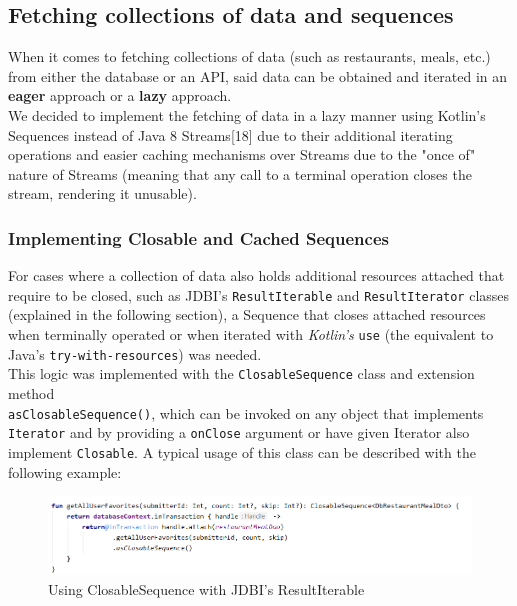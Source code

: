 \subsection{Fetching collections of data and sequences}

When it comes to fetching collections of data (such as restaurants, meals, etc.) from either the database or an API, said data can be obtained
and iterated in an \textbf{eager} approach or a \textbf{lazy} approach.\\

We decided to implement the fetching of data in a lazy manner using Kotlin’s Sequences\cite{sequences}
instead of Java 8 Streams[18] due to their additional iterating operations and easier caching mechanisms over Streams due to the "once of" nature
of Streams (meaning that any call to a terminal operation closes the stream, rendering it unusable).\\

\subsubsection{Implementing Closable and Cached Sequences}

For cases where a collection of data also holds additional resources attached that require to be closed,
such as JDBI's \texttt{ResultIterable} and \texttt{ResultIterator} classes (explained in the following section),
a Sequence that closes attached resources when terminally operated or when iterated with \textit{Kotlin's} \texttt{use}
(the equivalent to Java's \texttt{try-with-resources}) was needed.\\

This logic was implemented with the \texttt{ClosableSequence} class and extension method\\
\texttt{asClosableSequence()}, which can be invoked
on any object that implements \texttt{Iterator} and by providing a \texttt{onClose} argument or have given Iterator also implement \texttt{Closable}.
A typical usage of this class can be described with the following example:\\

\begin{figure}[H]
    \begin{center}
        \includegraphics[scale=0.8]{_figures/5.2.5-1.png}
        \caption{Using ClosableSequence with JDBI's ResultIterable}
    \end{center}
\end{figure}

